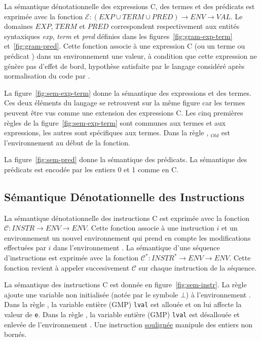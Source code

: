 

La sémantique dénotationnelle des expressions C, des termes et des prédicats
\eacsl est exprimée avec la fonction
$\mathcal{E} : (EXP \cup TERM \cup PRED) \rightarrow ENV \rightarrow VAL$.
Le domaines $EXP$, $TERM$ et $PRED$ correspondent respectivement aux entités
syntaxiques \textit{exp}, \textit{term} et \textit{pred} définies dans les
figures~\ref{fig:gram-exp-term} et~\ref{fig:gram-pred}.
Cette fonction associe à une expression C (ou un terme ou prédicat \eacsl) dans
un environnement une valeur, à condition que cette expression ne génère pas
d'effet de bord, hypothèse satisfaite par le langage considéré après
normalisation du code par \framac.

La figure~\ref{fig:sem-exp-term} donne la sémantique des expressions et des
termes.
Ces deux éléments du langage se retrouvent sur la même figure car les termes
peuvent être vus comme une extension des expressions C.
Les cinq premières règles de la figure~\ref{fig:sem-exp-term} sont communes aux
termes et aux expressions, les autres sont spécifiques aux termes.
Dans la règle , \env$_{Old}$ est l'environnement au début de la
fonction.

La figure~\ref{fig:sem-pred} donne la sémantique des prédicats.
La sémantique des prédicats est encodée par les entiers 0 et 1 comme en C.




\subsection{Sémantique Dénotationnelle des Instructions}

La sémantique dénotationnelle des instructions C est exprimée avec la fonction
$\mathcal{C} : INSTR \rightarrow ENV \rightarrow ENV$.
Cette fonction associe à une instruction $i$ et un environnement \env un nouvel
environnement qui prend en compte les modifications effectuées par $i$ dans
l'environnement \env.
La sémantique d'une séquence d'instructions est exprimée avec la fonction
$\mathcal{C}^{*} : INSTR^{*} \rightarrow ENV \rightarrow ENV$.
Cette fonction revient à appeler succesivement $\mathcal{C}$ sur chaque
instruction de la séquence.




La sémantique des instructions C est donnée en figure~\ref{fig:sem-instr}.
La règle  ajoute une variable non initialisée (notée par le
symbole $\bot$) à l'environnement \env.
Dans la règle , la variable entière (GMP) \lstinline'lval' est
allouée et on lui affecte la valeur de \lstinline'e'.
Dans la règle , la variable entière (GMP) \lstinline'lval'
est désallouée et enlevée de l'environnement \env.
Une instruction \underline{soulignée} manipule des entiers non bornés.

